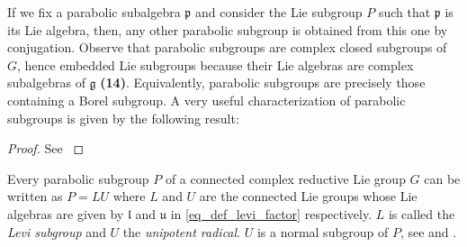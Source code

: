 If we fix a parabolic subalgebra \(\mathfrak{p}\) and consider the Lie subgroup \(P\) such that \(\mathfrak{p}\) is its Lie algebra, then, any other parabolic subgroup is obtained from this one by conjugation. Observe that parabolic subgroups are complex closed subgroups of \(G\), hence embedded Lie subgroups because their Lie algebras are complex subalgebras of \(\mathfrak{g}\) {\color{violet}\textbf{(14)}}. Equivalently, parabolic subgroups are precisely those containing a Borel subgroup. A very useful characterization of parabolic subgroups is given by the following result:

\begin{proof}
    See \parencite[Sec. 29.3]{humphreys1975linear}
\end{proof}

Every parabolic subgroup \(P\) of a connected complex reductive Lie group \(G\) can be written as \(P=LU\) where \(L\) and \(U\) are the connected Lie groups whose Lie algebras are given by \(\mathfrak{l}\) and \(\mathfrak{u}\) in \eqref{eq_def_levi_factor} respectively. \(L\) is called the \textit{Levi subgroup} and \(U\) the \textit{unipotent radical}. \(U\) is a normal subgroup of \(P\), see \parencite[Page 316]{bump2013lie} and \parencite[Sec. 2.1]{garcia2009hitchin}. 




